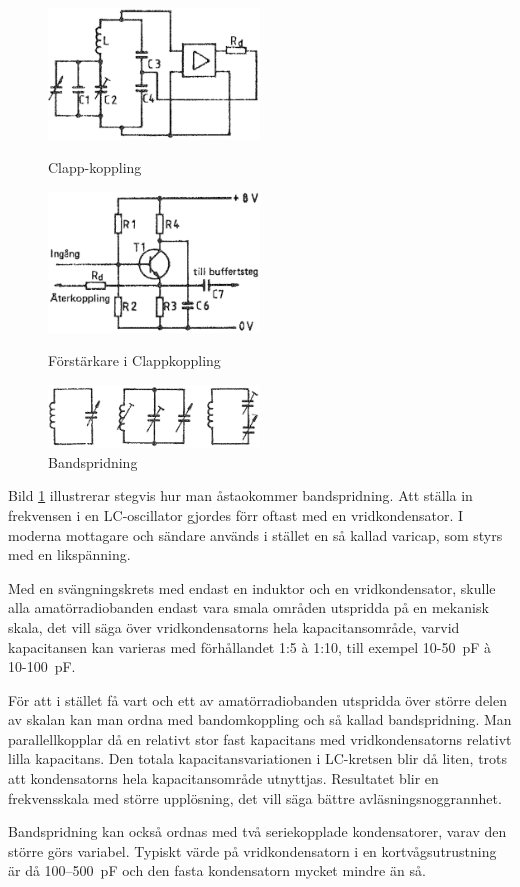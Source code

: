 \begin{figure}
  \includegraphics[width=0.5\textwidth]{images/cropped_pdfs/bild_2_3-73a.pdf}
  \caption{Clapp-koppling}
  \label{fig:BildII3-73a}

  \includegraphics[width=0.5\textwidth]{images/cropped_pdfs/bild_2_3-73b.pdf}
  \caption{Förstärkare i Clappkoppling}
  \label{fig:BildII3-73b}

  \includegraphics[width=0.5\textwidth]{images/cropped_pdfs/bild_2_3-74.pdf}
  \caption{Bandspridning}
  \label{fig:BildII3-74}
\end{figure}

Bild \ref{fig:BildII3-74} illustrerar stegvis hur man åstaokommer
bandspridning.
Att ställa in frekvensen i en LC-oscillator gjordes förr oftast med en
vridkondensator.
I moderna mottagare och sändare används i stället en så kallad varicap, som
styrs med en likspänning.

Med en svängningskrets med endast en induktor och en vridkondensator, skulle
alla amatörradiobanden endast vara smala områden utspridda på en mekanisk
skala, det vill säga över vridkondensatorns hela kapacitansområde, varvid
kapacitansen kan varieras med förhållandet 1:5 à 1:10, till exempel
10-50~pF à 10-100~pF.

För att i stället få vart och ett av amatörradiobanden utspridda över större
delen av skalan kan man ordna med bandomkoppling och så kallad bandspridning.
Man parallellkopplar då en relativt stor fast kapacitans med vridkondensatorns
relativt lilla kapacitans.
Den totala kapacitansvariationen i LC-kretsen blir då liten, trots att
kondensatorns hela kapacitansområde utnyttjas.
Resultatet blir en frekvensskala med större upplösning, det vill säga bättre
avläsningsnoggrannhet.

Bandspridning kan också ordnas med två seriekopplade kondensatorer,
varav den större görs variabel.
Typiskt värde på vridkondensatorn i en kortvågsutrustning är då 100--500~pF
och den fasta kondensatorn mycket mindre än så.

